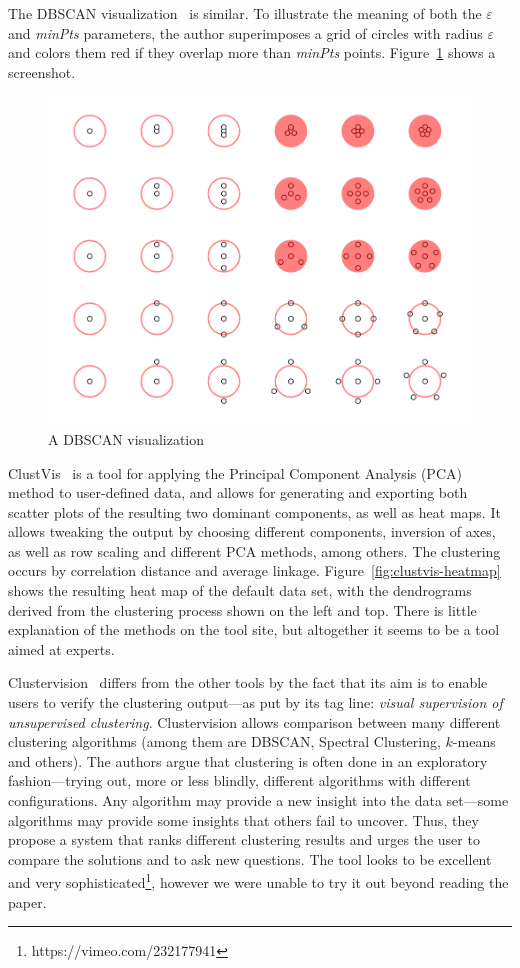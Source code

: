 \documentclass{vgtc} %
\begin{document}
The DBSCAN visualization~\cite{dbscan} is similar. To illustrate the meaning of
both the $\varepsilon$ and \emph{minPts} parameters, the author superimposes a
grid of circles with radius $\varepsilon$ and colors them red if they overlap
more than \emph{minPts} points. Figure~\ref{fig:dbscan} shows a screenshot.

\begin{figure}[tb]
    \centering
    \includegraphics[width=0.7\columnwidth]{dbscan}
    \caption{A DBSCAN visualization}
    \label{fig:dbscan}
\end{figure}

ClustVis~\cite{clustvis} is a tool for applying the Principal Component Analysis (PCA) method
to user-defined data, and allows for generating and exporting both scatter plots
of the resulting two dominant components, as well as heat maps. It allows tweaking
the output by choosing different components, inversion of axes, as well as row scaling
and different PCA methods, among others. The clustering occurs by correlation distance
and average linkage. Figure~\ref{fig:clustvis-heatmap} shows the resulting heat map of
the default data set, with the dendrograms derived from the clustering process shown
on the left and top. There is little explanation of the methods on the tool site, but
altogether it seems to be a tool aimed at experts.

Clustervision~\cite{clustervision} differs from the other tools by the fact
that its aim is to enable users to verify the clustering output---as put by its
tag line: \emph{visual supervision of unsupervised clustering}. Clustervision
allows comparison between many different clustering algorithms (among them are
DBSCAN, Spectral Clustering, $k$-means and others). The authors argue that
clustering is often done in an exploratory fashion---trying out, more or less
blindly, different algorithms with different configurations. Any algorithm may
provide a new insight into the data set---some algorithms may provide some
insights that others fail to uncover. Thus, they propose a system that ranks
different clustering results and urges the user to compare the solutions and to
ask new questions. The tool looks to be excellent and very
sophisticated\footnote{https://vimeo.com/232177941}, however we were unable to
try it out beyond reading the paper.
\end{document}
